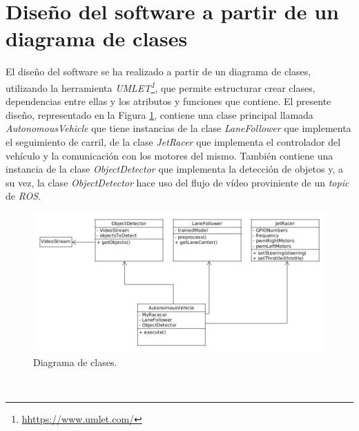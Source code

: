 \section{Diseño del software a partir de un diagrama de clases}
El diseño del software se ha realizado a partir de un diagrama de clases, utilizando la herramienta \textit{UMLET\footnote{\url{hhttps://www.umlet.com/}}}, que permite estructurar crear clases, dependencias entre ellas y los atributos y funciones que contiene. El presente diseño, representado en la Figura \ref{fig:diagram}, contiene una clase principal llamada \textit{AutonomousVehicle} que tiene instancias de la clase \textit{LaneFollower} que implementa el seguimiento de carril, de la clase \textit{JetRacer} que implementa el controlador del vehículo y la comunicación con los motores del mismo. También contiene una instancia de la clase \textit{ObjectDetector} que implementa la detección de objetos y, a su vez, la clase \textit{ObjectDetector} hace uso del flujo de vídeo proviniente de un \textit{topic} de \textit{ROS}.\\

\begin{figure} [h!]
	\begin{center}
		\includegraphics[width=14cm]{figs/diagram5}
	\end{center}
	\caption{Diagrama de clases.}
	\label{fig:diagram}
\end{figure}\

